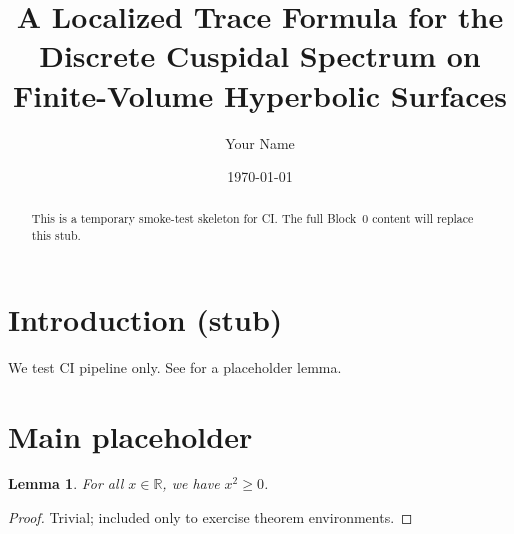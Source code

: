 \documentclass[11pt,reqno]{amsart}
\title[A Localized Trace Formula — Block 0]{A Localized Trace Formula for the Discrete Cuspidal Spectrum on Finite-Volume Hyperbolic Surfaces}
\author{Your Name}
\date{\today}
\newtheorem{lemma}{Lemma}
\theoremstyle{remark}
\begin{document}
\begin{abstract}
This is a temporary smoke-test skeleton for CI.
The full Block~0 content will replace this stub.
\end{abstract}

\maketitle

\section{Introduction (stub)}
We test CI pipeline only. See  for a placeholder lemma.

\section{Main placeholder}\label{sec:main}
\begin{lemma}
For all $x\in\mathbb{R}$, we have $x^2\ge 0$.
\end{lemma}
\begin{proof}
Trivial; included only to exercise theorem environments.
\end{proof}



\end{document}
